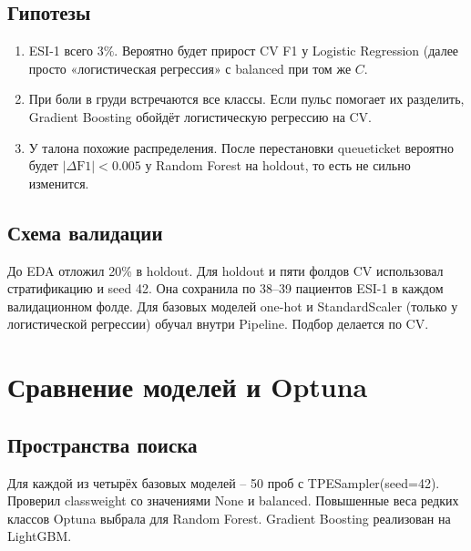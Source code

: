\documentclass[11pt,a4paper,twocolumn]{article}
\newcommand{\f}[1]{{\ttfamily\def\_{\textunderscore\allowbreak}#1}}
\begin{document}
\subsection{Гипотезы}

\begin{enumerate}
    \item ESI-1 всего $3\%$. Вероятно будет прирост CV F1 у Logistic Regression (далее просто «логистическая регрессия» с \f{balanced} при том же $C$.
    \item При боли в груди встречаются все классы. Если пульс помогает их разделить, Gradient Boosting обойдёт логистическую регрессию на CV.
    \item У талона похожие распределения. После перестановки \f{queue\_ticket} вероятно будет $|\Delta\mathrm{F1}|<0.005$ у Random Forest на holdout, то есть не сильно изменится.
\end{enumerate}

\subsection{Схема валидации}

До EDA отложил 20\% в holdout. Для holdout и пяти фолдов CV использовал стратификацию и seed 42. Она сохранила по 38--39 пациентов ESI-1 в каждом валидационном фолде. Для базовых моделей one-hot и \f{StandardScaler} (только у логистической регрессии) обучал внутри \f{Pipeline}. Подбор делается по CV.

\section{Сравнение моделей и Optuna}\label{sec:models}

\subsection{Пространства поиска}

Для каждой из четырёх базовых моделей – 50 проб с \f{TPESampler(seed=42)}. Проверил \f{class\_weight} со значениями \f{None} и \f{balanced}. Повышенные веса редких классов Optuna выбрала для Random Forest. Gradient Boosting реализован на LightGBM.
\end{document}
